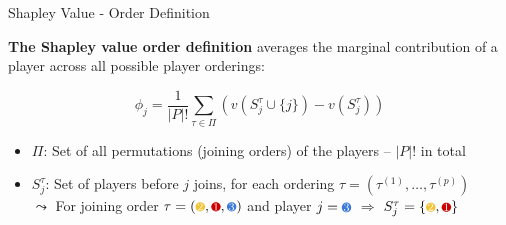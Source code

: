 \documentclass[10pt,compress,t,notes=noshow, xcolor=table]{beamer}
\newcommand{\Stau}{S_{j}^\tau}%
\begin{document}
\begin{frame}{Shapley Value - Order Definition}

\textbf{The Shapley value order definition} averages the marginal contribution of a player across all possible player orderings:

$$\phi_j = \frac{1}{|P|!} \sum_{\tau \in \Pi} (v(\Stau \cup \{j\}) - v(\Stau))$$
  
\begin{itemize}[<+->]
  \item $\Pi$: Set of all permutations (joining orders) of the players -- \(|P|!\) in total
  \item $\Stau$: Set of players before \(j\) joins, for each ordering \(\tau = (\tau^{(1)}, \dots, \tau^{(p)})\)\\
  \phantom{$\Rightarrow$} $\leadsto$ For joining order $\tau = \footnotesize(\colorcircle{playeryellow}{white}{2},\colorcircle{playerred}{white}{1},\colorcircle{playerblue}{white}{3})$ and player $j=\footnotesize\colorcircle{playerblue}{white}{3}$ $\Rightarrow$ $\Stau = \footnotesize\{\colorcircle{playeryellow}{white}{2},\colorcircle{playerred}{white}{1}\}$\\

\end{itemize}
\end{frame}
\end{document}

